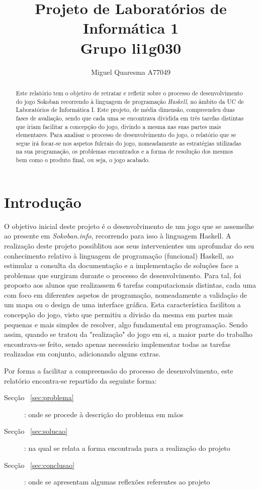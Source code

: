 \documentclass[a4paper]{article}
\title{Projeto de Laboratórios de Informática 1\\Grupo li1g030}
\author{Miguel Quaresma A77049}
\begin{document}
\maketitle

\begin{abstract}

Este relatório tem o objetivo de retratar e refletir sobre o processo de desenvolvimento do jogo Sokoban recorrendo à linguagem de programação \textit{Haskell}, no âmbito da UC de Laboratórios de Informática I. Este projeto, de média dimensão, compreendeu duas fases de avaliação, sendo que cada uma se encontrava dividida em três tarefas distintas que iriam facilitar a concepção do jogo, divindo a mesma nas suas partes mais elementares. 
Para analisar o processo de desenvolvimento do jogo, o relatório que se segue irá focar-se nos aspetos fulcrais do jogo, nomeadamente as estratégias utilizadas na sua programação, os problemas encontrados e a forma de resolução dos mesmos bem como o produto final, ou seja, o jogo acabado. 

\end{abstract}

\tableofcontents

\section{Introdução}
\label{sec:intro}

O objetivo inicial deste projeto é o desenvolvimento de um jogo que se assemelhe ao presente em \textit{Sokoban.info}, recorrendo para isso à linguagem Haskell. A realização deste projeto possiblitou aos seus intervenientes um aprofundar do seu conhecimento relativo à linguagem de programação (funcional) Haskell, ao estimular a consulta da documentação e a implementação de soluções face a problemas que surgiram durante o processo de desenvolvimento. Para tal, foi proposto aos alunos que realizassem 6 tarefas computacionais distintas, cada uma com foco em diferentes aspetos de programação, nomeadamente a validação de um mapa ou o design de uma interface gráfica. Esta característica facilitou a concepção do jogo, visto que permitiu a divisão da mesma em partes mais pequenas e mais simples de resolver, algo fundamental em programação. Sendo assim, quando se tratou da "realização" do jogo em si, a maior parte do trabalho encontrava-se feito, sendo apenas necessário implementar todas as tarefas realizadas em conjunto, adicionando alguns extras.

Por forma a facilitar a compreenssão do processo de desenvolvimento, este relatório encontra-se repartido da seguinte forma:
\begin{description}
	\item [Secção ~\ref{sec:problema} ] : onde se procede à descrição do problema em mãos
	\item [Secção ~\ref{sec:solucao} ] : na qual se relata a forma encontrada para a realização do projeto
	\item [Secção ~\ref{sec:conclusao} ] : onde se apresentam algumas reflexões referentes ao projeto
\end{description}
\end{document}
